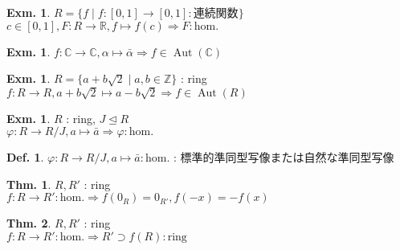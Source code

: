 \documentclass[uplatex,dvipdfmx,9pt]{beamer}
\newcommand{\Aut}{\operatorname{Aut}}
\newcommand{\ideal}{\trianglelefteq}
\renewcommand{\hom}{\text{hom.}} %
\newcommand{\Z}{\mathbb{Z}}
\newcommand{\R}{\mathbb{R}}
\newcommand{\C}{\mathbb{C}}
\newcounter{textExmCount}
\theoremstyle{definition} %
\newtheorem{defn}{Def.}[subsection] %
\newtheorem{thm}{Thm.}[subsection] %
\theoremstyle{example}
\newtheorem{exmText}[textExmCount]{Exm.}
\begin{document}
    \begin{frame}

      \begin{exmText}
        $R = \{f \mid f\colon [0, 1] \to [0, 1] : \text{連続関数}\}$ \\
        $c \in [0, 1], F\colon R \to \R, f \mapsto f(c) \Rightarrow F : \hom$
      \end{exmText}

      \begin{exmText}
        $f\colon \C \to \C, \alpha \mapsto \bar{\alpha} \Rightarrow f \in \Aut(\mathbb{C})$
      \end{exmText}

      \begin{exmText}
        $R = \{a + b\sqrt{2} \mid a, b \in \Z\}$ : ring \\
        $f\colon R \to R, a + b\sqrt{2} \mapsto a - b\sqrt{2} \Rightarrow f \in \Aut(R)$
      \end{exmText}
      
    \end{frame}

    \begin{frame}

      \begin{exmText}
        $R$ : ring, $J \ideal R$ \\
        $\varphi \colon R \to R/J, a \mapsto \bar{a} \Rightarrow \varphi : \hom$
      \end{exmText}

      \begin{defn}
        $\varphi \colon R \to R/J, a \mapsto \bar{a} : \hom$ : \alert{標準的準同型写像}または\alert{自然な準同型写像}
      \end{defn}

      \begin{thm}
        $R, R'$ : ring \\
        $f\colon R \to R' : \hom \Rightarrow f(0_R) = 0_{R'}, f(-x) = -f(x)$
      \end{thm}

      \begin{thm}
        $R, R'$ : ring \\
        $f\colon R \to R' : \hom \Rightarrow R' \supset f(R) : \text{ring}$
      \end{thm}
      
    \end{frame}
\end{document}

